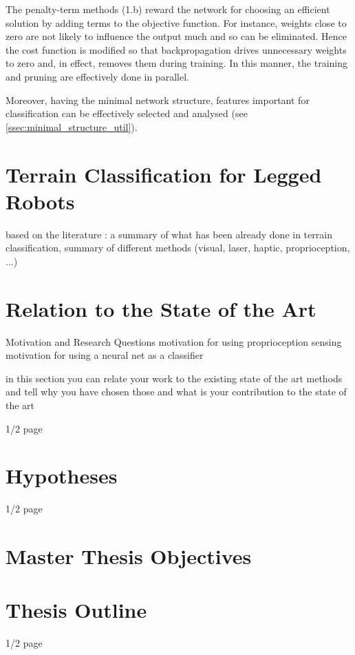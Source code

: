 The penalty-term methods (1.b) reward the network for choosing an efficient solution by adding terms to the objective function. For instance, weights close to zero are not likely to influence the output much and so can be eliminated. Hence the cost function is modified so that backpropagation drives unnecessary weights to zero and, in effect, removes them during training. In this manner, the training and pruning are effectively done in parallel.

Moreover, having the minimal network structure, features important for classification can be effectively selected and analysed (see \cref{ssec:minimal_structure_util}).

\section{Terrain Classification for Legged Robots} \label{sec:soa_terrain_classification}

based on the literature : a summary of what has been already done in terrain classification, summary of different methods (visual, laser, haptic, proprioception, ...)

\newpage
\section{Relation to the State of the Art}
Motivation and Research Questions
motivation for using proprioception sensing
motivation for using a neural net as a classifier

in this section you can relate your work to the existing state of the art methods and tell why you have chosen those and what is your contribution to the state of the art

1/2 page

\section{Hypotheses}

1/2 page

\newpage
\section{Master Thesis Objectives} \label{sec:goals}

\section{Thesis Outline}

1/2 page

